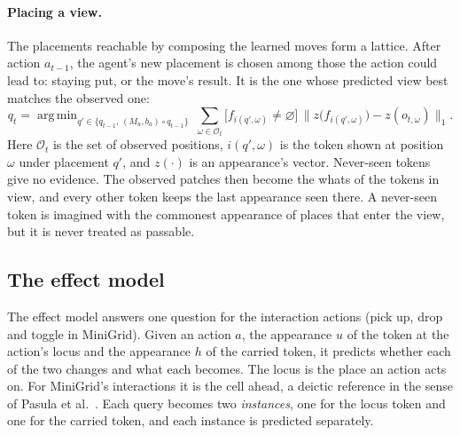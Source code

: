 \documentclass{article}
\DeclareMathOperator*{\argmin}{arg\,min}
\begin{document}
\paragraph{Placing a view.} The placements reachable by composing the learned moves form a lattice. After action $a_{t-1}$, the agent's new placement is chosen among those the action could lead to: staying put, or the move's result. It is the one whose predicted view best matches the observed one:
\begin{equation} \label{eq:placement}
    q_t = \argmin_{q'\in\{q_{t-1},\,(M_{a}, b_{a})\circ q_{t-1}\}}\ \sum_{\omega\in\mathcal{O}_t}\big[f_{i(q',\omega)}\neq\varnothing\big]\,\big\|z\big(f_{i(q',\omega)}\big) - z(o_{t,\omega})\big\|_1 .
\end{equation}
Here $\mathcal{O}_t$ is the set of observed positions, $i(q',\omega)$ is the token shown at position $\omega$ under placement $q'$, and $z(\cdot)$ is an appearance's vector. Never-seen tokens give no evidence. The observed patches then become the whats of the tokens in view, and every other token keeps the last appearance seen there. A never-seen token is imagined with the commonest appearance of places that enter the view, but it is never treated as passable.

\subsection{The effect model}
\label{sec:effects}

The effect model answers one question for the interaction actions (pick up, drop and toggle in MiniGrid). Given an action $a$, the appearance $u$ of the token at the action's locus and the appearance $h$ of the carried token, it predicts whether each of the two changes and what each becomes. The locus is the place an action acts on. For MiniGrid's interactions it is the cell ahead, a deictic reference in the sense of Pasula et al.~\cite{Pasula2007}. Each query becomes two \emph{instances}, one for the locus token and one for the carried token, and each instance is predicted separately.
\end{document}
